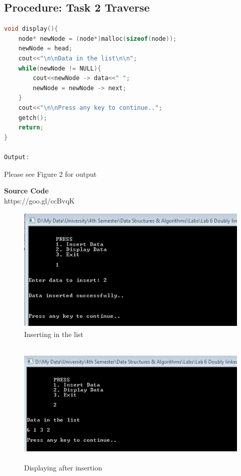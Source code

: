 \documentclass[11pt]{article}            %
\begin{document}
\subsection{Procedure: Task 2 Traverse}     

\begin{lstlisting}[language=C++]
void display(){
	node* newNode = (node*)malloc(sizeof(node));
	newNode = head;
	cout<<"\n\nData in the list\n\n";
	while(newNode != NULL){
		cout<<newNode -> data<<" ";
		newNode = newNode -> next;
	}
	cout<<"\n\nPress any key to continue..";
	getch();
	return;
}

Output: 
\end{lstlisting}
Please see Figure 2 for output

\textbf{Source Code} \\
https://goo.gl/ccBvqK

\begin{figure}[b!]
\centering
  \includegraphics[width=12cm,height=6cm,keepaspectratio]{1.png}
\caption{Inserting in the list}
\label{Figure:1}    
\end{figure}

\begin{figure}
\centering
\includegraphics[width=12cm,height=6cm,keepaspectratio]{2.png}
\caption{Displaying after insertion}
\label{Figure:2}    
\end{figure}
\end{document}
